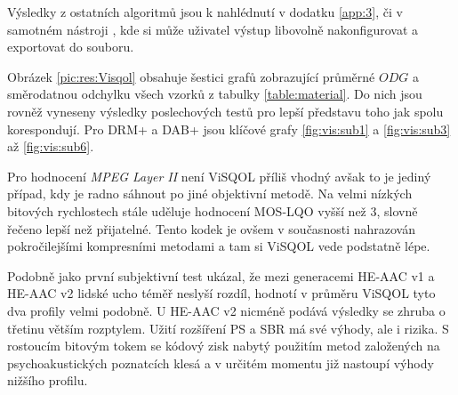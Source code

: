 Výsledky z ostatních algoritmů jsou k nahlédnutí v dodatku \ref{app:3}, či v samotném nástroji , kde si může uživatel výstup libovolně nakonfigurovat a exportovat do souboru.

Obrázek \ref{pic:res:Visqol} obsahuje šestici grafů zobrazující průměrné $ODG$ a směrodatnou odchylku všech vzorků z tabulky \ref{table:material}. Do nich jsou rovněž vyneseny výsledky poslechových testů pro lepší představu toho jak spolu korespondují. Pro DRM+ a DAB+ jsou klíčové grafy \ref{fig:vis:sub1} a  \ref{fig:vis:sub3} až \ref{fig:vis:sub6}.

Pro hodnocení \textit{MPEG Layer II} není ViSQOL příliš vhodný avšak to je jediný případ, kdy je radno sáhnout po jiné objektivní metodě. Na velmi nízkých bitových rychlostech stále uděluje hodnocení MOS-LQO vyšší než 3, slovně řečeno lepší než přijatelné. Tento kodek je ovšem v současnosti nahrazován pokročilejšími kompresními metodami a tam si ViSQOL vede podstatně lépe.

Podobně jako první subjektivní test ukázal, že mezi generacemi HE-AAC v1 a HE-AAC v2 lidské ucho téměř neslyší rozdíl, hodnotí v průměru ViSQOL tyto dva profily velmi podobně. U HE-AAC v2 nicméně podává výsledky se zhruba o třetinu větším rozptylem. Užití rozšíření PS a SBR má své výhody, ale i rizika. S rostoucím bitovým tokem se kódový zisk nabytý použitím metod založených na psychoakustických poznatcích klesá a v určitém momentu již nastoupí výhody nižšího profilu.

